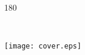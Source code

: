 \documentclass[12pt, letterpaper]{article}
\begin{document}
    \begin{minipage}[c][0.50\textheight][c]{0.50\textwidth}
        \centering
        \begin{turn}{180}
        \huge
        \raisebox{2.5cm}{Holiday Wishes}
        \end{turn}
    \end{minipage}

    \hfill \\ \vfill \hfill

    \begin{minipage}[c][0.50\textheight][c]{0.50\textwidth}
        \centering
        \texttt{[image: cover.eps]}
    \end{minipage}
\end{document}
